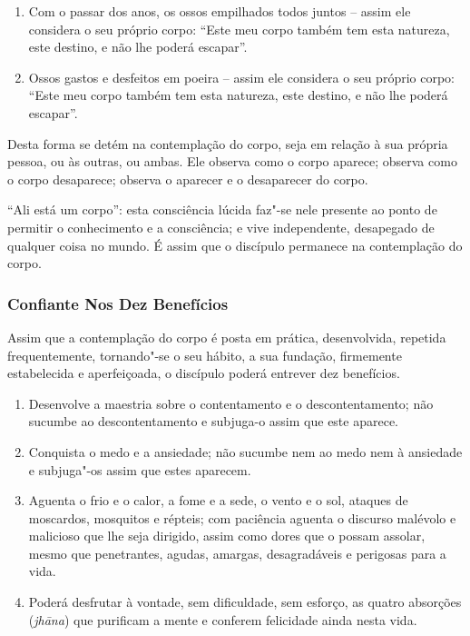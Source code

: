 \begin{enumerate}
  \item Com o passar dos anos, os ossos empilhados todos juntos -- assim ele
        considera o seu próprio corpo: “Este meu corpo também tem esta
        natureza, este destino, e não lhe poderá escapar”.

  \item Ossos gastos e desfeitos em poeira -- assim ele considera o seu próprio
        corpo: “Este meu corpo também tem esta natureza, este destino, e não
        lhe poderá escapar”.

\end{enumerate}

Desta forma se detém na contemplação do corpo, seja em relação à sua própria
pessoa, ou às outras, ou ambas. Ele observa como o corpo aparece; observa como o
corpo desaparece; observa o aparecer e o desaparecer do corpo.

“Ali está um corpo”: esta consciência lúcida faz"-se nele presente ao ponto de
permitir o conhecimento e a consciência; e vive independente, desapegado de
qualquer coisa no mundo. É assim que o discípulo permanece na contemplação do
corpo.


\subsubsection{Confiante Nos Dez Benefícios}

Assim que a contemplação do corpo é posta em prática, desenvolvida, repetida
frequentemente, tornando"-se o seu hábito, a sua fundação, firmemente
estabelecida e aperfeiçoada, o discípulo poderá entrever dez benefícios.

\begin{enumerate}
  \item Desenvolve a maestria sobre o contentamento e o descontentamento; não
        sucumbe ao descontentamento e subjuga-o assim que este aparece.

  \item Conquista o medo e a ansiedade; não sucumbe nem ao medo nem à ansiedade
        e subjuga"-os assim que estes aparecem.

  \item Aguenta o frio e o calor, a fome e a sede, o vento e o sol, ataques de
        moscardos, mosquitos e répteis; com paciência aguenta o discurso
        malévolo e malicioso que lhe seja dirigido, assim como dores que o
        possam assolar, mesmo que penetrantes, agudas, amargas, desagradáveis e
        perigosas para a vida.

  \item Poderá desfrutar à vontade, sem dificuldade, sem esforço, as quatro
        absorções (\emph{jhāna}) que purificam a mente e conferem felicidade
        ainda nesta vida.
\end{enumerate}

